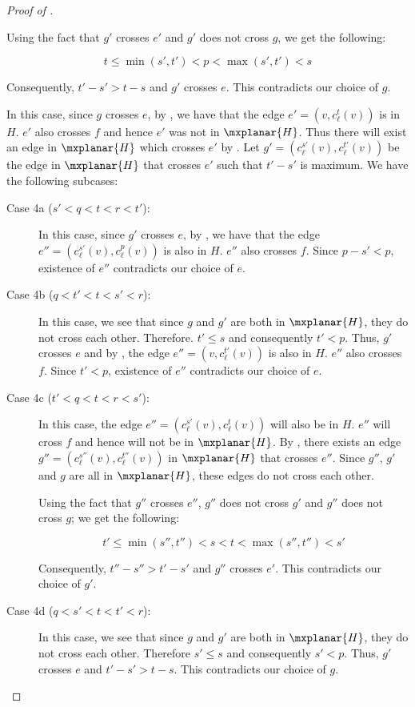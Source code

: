 \documentclass{toc}
\begin{document}
\begin{proof}[Proof of ]
\begin{description}
Using the fact that $g'$ crosses $e'$ and $g'$ does not cross $g$, we get the following:

\[t \leq \min(s',t') < p < \max(s', t') < s\]

Consequently, $t'-s' > t-s$ and $g'$ crosses $e$. This contradicts our choice of $g$.


\item[Case 4 ($q<s<p<t<r$):] In this case, since $g$ crosses $e$, by
, we have that the edge $e' = (v, c_{\ell}^t(v))$ is %
 in $H$. $e'$ also crosses $f$ and hence $e'$ was not %
 in $\mxplanar{H}$. Thus there will exist an edge in $\mxplanar{H}$ which crosses $e'$ by . Let $g' = (c_{\ell}^{s'}(v), c_{\ell}^{t'}(v))$ be the edge in $\mxplanar{H}$ that crosses $e'$ such that $t'-s'$ is maximum. We have the following subcases:
\begin{description}
\item[Case 4a ($s'<q<t<r<t'$):]In this case, since $g'$ crosses $e$, by , we have that the edge $e'' = (c_{\ell}^{s'}(v), c_{\ell}^p(v))$ is also %
 in $H$. $e''$ also crosses $f$. Since $p-s' < p$, existence of $e''$ contradicts our choice of $e$.
\item[Case 4b ($q<t'<t<s'<r$):] In this case, we see that since $g$ and $g'$ are both %
 in $\mxplanar{H}$, they
do not %
cross each other. Therefore. $t' \leq s$ and consequently $t' < p$. Thus, $g'$ crosses $e$ and by , the edge $e'' = (v, c_{\ell}^{t'}(v))$ is also %
 in $H$. $e''$ also crosses $f$. Since $t' < p$, existence of $e''$ contradicts our choice of $e$.
\item[Case 4c ($t'<q<t<r<s'$):] In this case, the edge $e'' = (c_{\ell}^{s'}(v), c_{\ell}^t(v))$ will also be %
 in $H$. $e''$ will cross $f$ and hence will not be %
 in $\mxplanar{H}$. By , there exists an edge $g'' = (c_{\ell}^{s''}(v), c_{\ell}^{t''}(v))$ in $\mxplanar{H}$ that crosses $e''$. Since $g''$, $g'$ and $g$ are all %
 in $\mxplanar{H}$, these edges 
do not %
cross each other. 

Using the fact that $g''$ crosses $e''$, $g''$ does not cross $g'$ and $g''$ does not cross $g$; we get the following:

\[t' \leq \min(s'',t'') <s< t < \max(s'', t'') < s'\]

Consequently, $t''-s'' > t'-s'$ and $g''$ crosses $e'$. This contradicts our choice of $g'$.

\item[Case 4d ($q<s'<t<t'<r$):] In this case, we see that since $g$ and $g'$ are both %
 in $\mxplanar{H}$, they
do not %
cross each other. Therefore $s' \leq s$ and consequently $s' < p$. Thus, $g'$ crosses $e$ and $t' - s' > t-s$. This contradicts our choice of $g$.


\end{description}
\end{description}
\end{proof}
\end{document}
